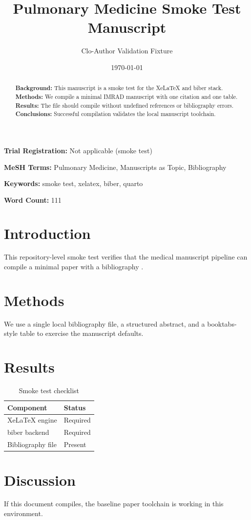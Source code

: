 \documentclass[12pt]{article}
\title{Pulmonary Medicine Smoke Test Manuscript}
\author{Clo-Author Validation Fixture}
\date{\today}
\begin{document}
\maketitle
\thispagestyle{empty}
\newpage
\setcounter{page}{1}

\begin{abstract}
\noindent\singlespacing
\textbf{Background:} This manuscript is a smoke test for the XeLaTeX and biber stack.
\textbf{Methods:} We compile a minimal IMRAD manuscript with one citation and one table.
\textbf{Results:} The file should compile without undefined references or bibliography errors.
\textbf{Conclusions:} Successful compilation validates the local manuscript toolchain.
\end{abstract}

\vspace{0.5em}
\noindent\textbf{Trial Registration:} Not applicable (smoke test)

\vspace{0.5em}
\noindent\textbf{MeSH Terms:} Pulmonary Medicine, Manuscripts as Topic, Bibliography

\vspace{0.5em}
\noindent\textbf{Keywords:} smoke test, xelatex, biber, quarto

\vspace{0.5em}
\noindent\textbf{Word Count:} 111

\section{Introduction}
This repository-level smoke test verifies that the medical manuscript pipeline can compile a minimal paper with a bibliography \cite{doe2024smoke}.

\section{Methods}
We use a single local bibliography file, a structured abstract, and a booktabs-style table to exercise the manuscript defaults.

\section{Results}
\begin{table}[htbp]
\centering
\begin{threeparttable}
\caption{Smoke test checklist}
\begin{tabular}{ll}
\toprule
Component & Status \\
\midrule
XeLaTeX engine & Required \\
biber backend & Required \\
Bibliography file & Present \\
\bottomrule
\end{tabular}
\end{threeparttable}
\end{table}

\section{Discussion}
If this document compiles, the baseline paper toolchain is working in this environment.

\clearpage
\small
\printbibliography
\end{document}
